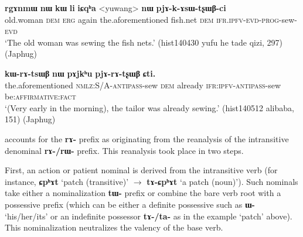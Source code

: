 \documentclass[oneside,a4paper,11pt]{article}
\newcommand{\ipa}[1]{{\phon\textbf{#1}}}
\begin{document}

\begin{exe}
\ex \label{ex:pjAkAsWtsxWBci}
\gll 
\ipa{rgɤnmɯ}	\ipa{nɯ}	\ipa{kɯ}	\ipa{li}	\ipa{iɕqʰa}	<yuwang>	\ipa{nɯ}	\ipa{pjɤ-k-ɤsɯ-tʂɯβ-ci} \\
old.woman \textsc{dem} \textsc{erg} again the.aforementioned fish.net \textsc{dem} \textsc{ifr.ipfv-evd-prog}-sew-\textsc{evd} \\
\glt `The old woman was sewing the fish nets.' (hist140430 yufu he tade qizi, 297) (Japhug)
\end{exe}

\begin{exe}
\ex \label{ex:pjArAtsxWB}
\gll \ipa{iɕqʰa}	\ipa{kɯ-rɤ-tsɯβ}	\ipa{nɯ}	\ipa{pɤjkʰu}	\ipa{pjɤ-rɤ-tʂɯβ}	\ipa{ɕti.} \\
the.aforementioned \textsc{nmlz:S/A-antipass}-sew  \textsc{dem} already  \textsc{ifr:ipfv-antipass}-sew be:\textsc{affirmative:fact} \\
\glt `(Very early in the morning), the tailor was already sewing.' (hist140512 alibaba, 151) (Japhug)
\end{exe}

\citet{jacques14antipassive} accounts for the \ipa{rɤ-} prefix as originating from the reanalysis of the intransitive denominal \ipa{rɤ-/rɯ-} prefix. This reanalysis took place in two steps. 

First, an action or patient nominal is derived from the intransitive verb (for instance, \ipa{ɕpʰɤt} `patch (transitive)' $\rightarrow$  \ipa{tɤ-ɕpʰɤt} `a patch (noun)'). Such nominals take either a nominalization \ipa{tɯ-} prefix or combine the bare verb root with a possessive prefix (which can be either a definite possessive such as \ipa{ɯ-} `his/her/its' or an indefinite possessor \ipa{tɤ-/ta-} as in the example `patch' above). This nominalization neutralizes the valency of the base verb.
\end{document}
